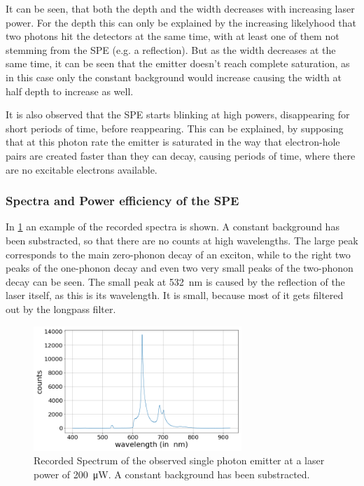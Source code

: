 It can be seen, that both the depth and the width decreases with increasing laser power.
For the depth this can only be explained by the increasing likelyhood that two photons hit the detectors at the same time, with at least one of them not stemming from the SPE (e.g. a reflection).
But as the width decreases at the same time, it can be seen that the emitter doesn't reach complete saturation, as in this case only the constant background would increase causing the width at half depth to increase as well.

It is also observed that the SPE starts blinking at high powers, disappearing for short periods of time, before reappearing.
This can be explained, by supposing that at this photon rate the emitter is saturated in the way that electron-hole pairs are created faster than they can decay, causing periods of time, where there are no excitable electrons available. %

\subsubsection{Spectra and Power efficiency of the SPE}

In \cref{fig_spe_spectrum_example} an example of the recorded spectra is shown.
A constant background has been substracted, so that there are no counts at high wavelengths.
The large peak corresponds to the main zero-phonon decay of an exciton, while to the right two peaks of the one-phonon decay and even two very small peaks of the two-phonon decay can be seen. %
The small peak at \SI{532}{nm} is caused by the reflection of the laser itself, as this is its wavelength.
It is small, because most of it gets filtered out by the longpass filter.

\begin{figure}[!ht]
    \centering
    \includegraphics[width=0.7\textwidth]{img/output_t2/spektrum_example_bgcorr_200.0muW.png}
    \caption{Recorded Spectrum of the observed single photon emitter at a laser power of \SI{200}{\micro W}. A constant background has been substracted.}
    \label{fig_spe_spectrum_example}
\end{figure}


